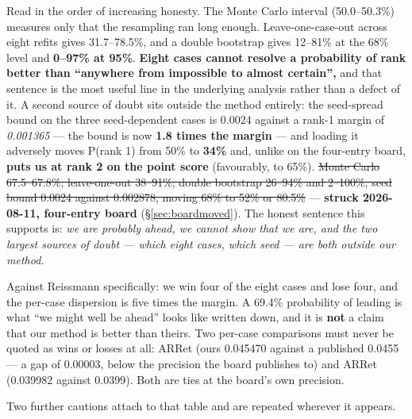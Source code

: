 \documentclass[11pt,a4paper]{article}
\newcommand{\breakus}{\textunderscore\allowbreak}
\newcommand{\code}[1]{{\small\ttfamily\let\_\breakus #1}}
\begin{document}
Read in the order of increasing honesty. The Monte Carlo interval (50.0--50.3\%) measures only
that the resampling ran long enough. Leave-one-case-out across eight refits gives 31.7--78.5\%, and
a double bootstrap gives 12--81\% at the 68\% level and \textbf{0--97\% at 95\%}. \textbf{Eight cases
cannot resolve a probability of rank better than ``anywhere from impossible to almost
certain'',} and that sentence is the most useful line in the underlying analysis rather than a
defect of it. A second source of doubt sits outside the method entirely: the seed-spread bound
on the three seed-dependent cases is 0.0024 against a rank-1 margin of \emph{0.001365} --- the
bound is now \textbf{1.8 times the margin} --- and loading it
adversely moves P(rank 1) from 50\% to \textbf{34\%} and, unlike on the four-entry board,
\textbf{puts us at rank 2 on the point score} (favourably, to 65\%).
\sout{Monte Carlo 67.5--67.8\%; leave-one-out 38--91\%; double bootstrap 26--94\% and
2--100\%; seed bound 0.0024 against 0.002878, moving 68\% to 52\% or 80.5\%} ---
\textbf{struck 2026-08-11, four-entry board} (\S\ref{sec:boardmoved}). The honest
sentence this supports is: \emph{we are probably ahead, we cannot show that we are, and the two
largest sources of doubt --- which eight cases, which seed --- are both outside our method.}

Against Reissmann specifically: we win four of the eight cases and lose four, and the
per-case dispersion is five times the margin. A 69.4\% probability of leading is what ``we
might well be ahead'' looks like written down, and it is \textbf{not} a claim that our method
is better than theirs. Two per-case comparisons must never be quoted as wins or losses at all:
\code{AR\_1\_Ret\_360} (ours 0.045470 against a published 0.0455 --- a gap of 0.00003, below
the precision the board publishes to) and \code{AR\_3\_Ret\_360} (0.039982 against 0.0399).
Both are ties at the board's own precision.

Two further cautions attach to that table and are repeated wherever it appears.
\end{document}
